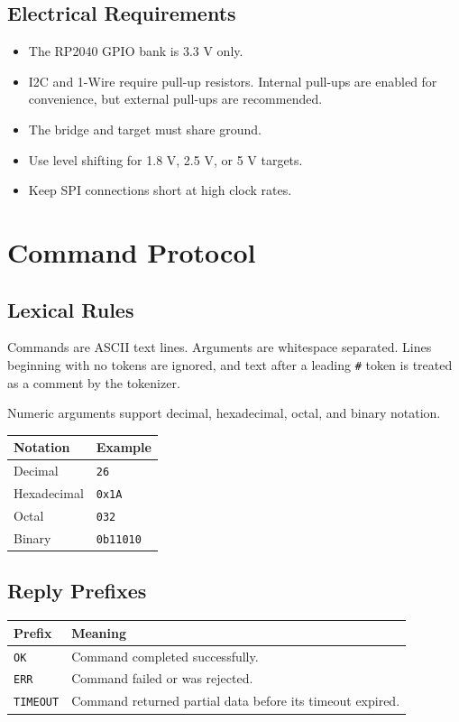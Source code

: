 \documentclass[11pt]{article}
\begin{document}
\subsection{Electrical Requirements}

\begin{itemize}[nosep]
  \item The RP2040 GPIO bank is 3.3 V only.
  \item I2C and 1-Wire require pull-up resistors. Internal pull-ups are enabled for convenience, but external pull-ups are recommended.
  \item The bridge and target must share ground.
  \item Use level shifting for 1.8 V, 2.5 V, or 5 V targets.
  \item Keep SPI connections short at high clock rates.
\end{itemize}

\section{Command Protocol}

\subsection{Lexical Rules}

Commands are ASCII text lines. Arguments are whitespace separated. Lines beginning with no tokens are ignored, and text after a leading \texttt{\#} token is treated as a comment by the tokenizer.

Numeric arguments support decimal, hexadecimal, octal, and binary notation.

\begin{longtable}{ll}
\toprule
Notation & Example \\
\midrule
Decimal & \texttt{26} \\
Hexadecimal & \texttt{0x1A} \\
Octal & \texttt{032} \\
Binary & \texttt{0b11010} \\
\bottomrule
\end{longtable}

\subsection{Reply Prefixes}

\begin{longtable}{ll}
\toprule
Prefix & Meaning \\
\midrule
\texttt{OK} & Command completed successfully. \\
\texttt{ERR} & Command failed or was rejected. \\
\texttt{TIMEOUT} & Command returned partial data before its timeout expired. \\
\bottomrule
\end{longtable}
\end{document}
